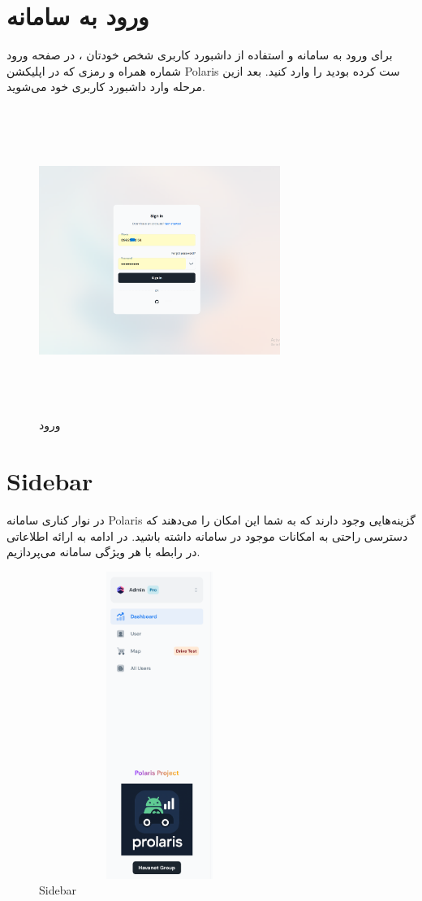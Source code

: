 \documentclass{report}
\begin{document}
\section{ورود به سامانه}
برای ورود به سامانه و استفاده از داشبورد کاربری شخص خودتان ، در صفحه ورود شماره همراه و رمزی که در اپلیکشن Polaris ست کرده بودید را وارد کنید. بعد ازین مرحله وارد داشبورد کاربری خود می‌شوید.
\begin{figure}[ht]
	\centering
	\includegraphics[width=0.7\textwidth,height=10cm,keepaspectratio]{Pic/signup_front}
	\caption{ورود}
	\label{fig:signup_front}
\end{figure}
\section{Sidebar}
در نوار کناری سامانه Polaris گزینه‌هایی وجود دارند که به شما این امکان را می‌دهند که دسترسی راحتی به امکانات موجود در سامانه داشته باشید.
در ادامه به ارائه اطلاعاتی در رابطه با هر ویژگی سامانه می‌پردازیم.
  \begin{figure}[ht]
	\centering
	\includegraphics[width=0.7\textwidth,height=10cm,keepaspectratio]{Pic/sidebar}
	\caption{Sidebar}
	\label{fig:sidebar}
\end{figure}
\end{document}
